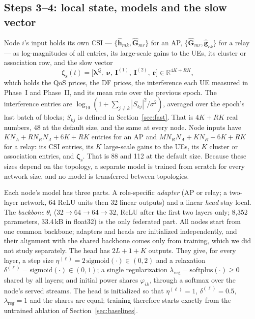 \documentclass[conference]{IEEEtran}
\newcommand{\abs}[1]{\left\lvert #1 \right\rvert}
\newcommand{\R}{\mathbb{R}}
\newcommand{\zs}{\boldsymbol{\zeta}_{\mathrm{s}}}
\begin{document}
\subsection{Steps 3--4: local state, models and the slow vector}
Node $i$'s input holds its own CSI --- $\{\hat{\mathbf{h}}_{mk},
\hat{\mathbf{G}}_{mr}\}$ for an AP, $\{\hat{\mathbf{G}}_{mr},
\hat{\mathbf{g}}_{rk}\}$ for a relay --- as log-magnitudes of all entries,
its large-scale gains to the UEs, its cluster or association row, and the
slow vector
\begin{equation}
\zs(t) = \bigl[\boldsymbol\lambda^Q,\ \boldsymbol\nu,\
\mathbf{I}^{(1)},\ \mathbf{I}^{(2)},\ \bar{\mathbf{r}}\bigr]
\in\R^{4K+RK},
\label{eq:zslow}
\end{equation}
which holds the QoS prices, the DF prices, the interference each UE measured
in Phase~I and Phase~II, and its mean rate over the previous epoch. The
interference entries are $\log_{10}(1+\sum_{j\ne k}\abs{S_{kj}}^2/\sigma^2)$,
averaged over the epoch's last batch of blocks; $S_{kj}$ is defined in
Section~\ref{sec:fast}. That is $4K+RK$ real numbers, 48 at the default size,
and the same at every node. Node inputs have $KN_A+RN_RN_A+6K+RK$ entries for
an AP and $MN_RN_A+KN_R+6K+RK$ for a relay: its CSI entries, its $K$
large-scale gains to the UEs, its $K$ cluster or association entries, and
$\zs$. That is 88 and 112 at the default size. Because these sizes depend on
the topology, a separate model is trained from scratch for every network
size, and no model is transferred between topologies.

Each node's model has three parts. A role-specific \emph{adapter} (AP or
relay; a two-layer network, 64 ReLU units then 32 linear outputs) and a
linear \emph{head} stay local. The \emph{backbone} $\theta_i$
($32\to64\to64\to32$, ReLU after the first two layers only; 8{,}352
parameters, 33.4\,kB in float32) is the only federated part. All nodes start
from one common backbone; adapters and heads are initialized independently,
and their alignment with the shared backbone comes only from training,
which we did not study separately. The head has $2L+1+K$ outputs. They give, for every layer, a
step size $\eta^{(\ell)} = 2\,\mathrm{sigmoid}(\cdot)\in(0,2)$ and a
relaxation $\delta^{(\ell)} = \mathrm{sigmoid}(\cdot)\in(0,1)$; a single
regularization $\lambda_{\mathrm{reg}} = \mathrm{softplus}(\cdot)\ge0$ shared
by all layers; and initial power shares $\varphi_{ik}$, through a softmax over
the node's served streams. The head is initialized so that $\eta^{(\ell)}=1$,
$\delta^{(\ell)}=0.5$, $\lambda_{\mathrm{reg}}=1$ and the shares are equal;
training therefore starts exactly from the untrained ablation of
Section~\ref{sec:baselines}.
\end{document}
